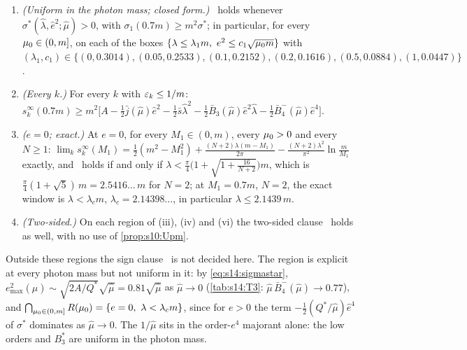 \begin{proposition}
\begin{enumerate}[label=\textup{(\roman*)},leftmargin=*]
\item \emph{(Uniform in the photon mass; closed form.)} \Tthree\ holds whenever $\sigma^*(\hat\lambda,\hat e^2;\hat\mu)>0$, with $\sigma_1(0.7m)\ge m^2\sigma^*$; in particular, for every $\mu_0\in(0,m]$, on each of the boxes $\{\lambda\le\lambda_1m,\ e^2\le c_1\sqrt{\mu_0 m}\}$ with $(\lambda_1,c_1)\in\{(0,0.3014),(0.05,0.2533),(0.1,0.2152),(0.2,0.1616),(0.5,0.0884),(1,0.0447)\}$.
\item \emph{(Every $k$.)} For every $k$ with $\varepsilon_k\le1/m$: $s^\infty_k(0.7m)\ge m^2\big[A-\frac12\bar j(\hat\mu)\hat e^2-\frac12\bar s\hat\lambda^2-\frac12\bar B_3(\hat\mu)\hat e^2\hat\lambda-\frac12\bar B_4^-(\hat\mu)\hat e^4\big]$.
\item \emph{($e=0$; exact.)} At $e=0$, for every $M_1\in(0,m)$, every $\mu_0>0$ and every $N\ge1$: $\lim_ks^\infty_k(M_1)=\frac12(m^2-M_1^2)+\frac{(N+2)\lambda(m-M_1)}{2\pi}-\frac{(N+2)\lambda^2}{\pi^2}\ln\frac m{M_1}$ exactly, and \Tthree\ holds if and only if $\lambda<\frac\pi4\big(1+\sqrt{1+\frac{16}{N+2}}\big)m$, which is $\frac\pi4(1+\sqrt5)\,m=2.5416\ldots\,m$ for $N=2$; at $M_1=0.7m$, $N=2$, the exact window is $\lambda<\lambda_cm$, $\lambda_c=2.14398\ldots$, in particular $\lambda\le2.1439\,m$.
\item \emph{(Two-sided.)} On each region of (iii), (iv) and (vi) the two-sided clause \sxivNE\ holds as well, with no use of \cref{prop:s10:Upm}.
\end{enumerate}
\end{proposition}

Outside these regions the sign clause \Tthree\ is not decided here. The region is explicit at every photon mass but not uniform in it: by \eqref{eq:s14:sigmastar}, $e^2_{\max}(\hat\mu)\sim\sqrt{2A/Q^*}\sqrt{\hat\mu}=0.81\sqrt{\hat\mu}$ as $\hat\mu\to0$ (\cref{tab:s14:T3}: $\hat\mu\,\bar B_4^-(\hat\mu)\to0.77$), and $\bigcap_{\lmu\in(0,m]}R(\lmu)=\{e=0,\ \lambda<\lambda_cm\}$, since for $e>0$ the term $-\frac12(Q^*/\hat\mu)\hat e^4$ of $\sigma^*$ dominates as $\hat\mu\to0$. The $1/\hat\mu$ sits in the order-$e^4$ majorant alone: the low orders and $B_3^*$ are uniform in the photon mass.



